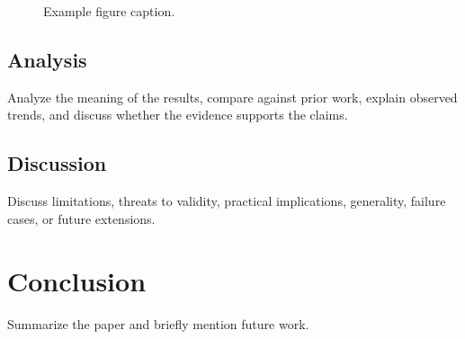 \documentclass[letterpaper,10pt,journal,twoside]{IEEEtran}
\begin{document}
\begin{figure}[t]
\centering
\caption{Example figure caption.}
\label{fig:example}
\end{figure}

\subsection{Analysis}
\label{subsec:analysis}

Analyze the meaning of the results, compare against prior work, explain
observed trends, and discuss whether the evidence supports the claims.

\subsection{Discussion}
\label{subsec:discussion}

Discuss limitations, threats to validity, practical implications, generality,
failure cases, or future extensions.

\section{Conclusion}
\label{sec:conclusion}

Summarize the paper and briefly mention future work.



\end{document}
